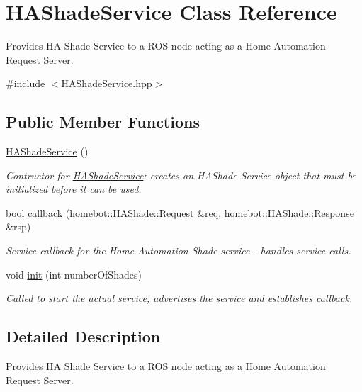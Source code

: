\hypertarget{classHAShadeService}{\section{H\-A\-Shade\-Service Class Reference}
\label{classHAShadeService}
}


Provides H\-A Shade Service to a R\-O\-S node acting as a Home Automation Request Server.  




{\ttfamily \#include $<$H\-A\-Shade\-Service.\-hpp$>$}

\subsection*{Public Member Functions}
\begin{DoxyCompactItemize}
\item 
\hypertarget{classHAShadeService_a83776c74c7f1c90380eb689f6ec7cf3b}{\hyperlink{classHAShadeService_a83776c74c7f1c90380eb689f6ec7cf3b}{H\-A\-Shade\-Service} ()}\label{classHAShadeService_a83776c74c7f1c90380eb689f6ec7cf3b}

\begin{DoxyCompactList}\small\item\em Contructor for \hyperlink{classHAShadeService}{H\-A\-Shade\-Service}; creates an H\-A\-Shade Service object that must be initialized before it can be used. \end{DoxyCompactList}\item 
bool \hyperlink{classHAShadeService_afb00b476dd2c9bf9e5cc8ba349d7bc1f}{callback} (homebot\-::\-H\-A\-Shade\-::\-Request \&req, homebot\-::\-H\-A\-Shade\-::\-Response \&rsp)
\begin{DoxyCompactList}\small\item\em Service callback for the Home Automation Shade service -\/ handles service calls. \end{DoxyCompactList}\item 
void \hyperlink{classHAShadeService_aaf2aed9dc0d79a7dbfbfe6537e624e24}{init} (int number\-Of\-Shades)
\begin{DoxyCompactList}\small\item\em Called to start the actual service; advertises the service and establishes callback. \end{DoxyCompactList}\end{DoxyCompactItemize}


\subsection{Detailed Description}
Provides H\-A Shade Service to a R\-O\-S node acting as a Home Automation Request Server. 

